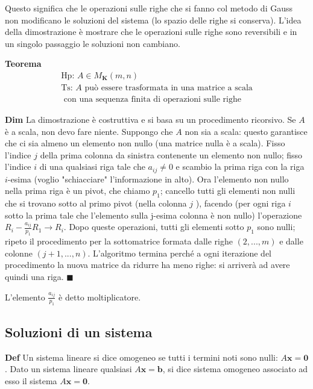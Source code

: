 \documentclass{article}
\begin{document}
Questo significa che le operazioni sulle righe che si fanno col metodo di
Gauss non modificano le soluzioni del sistema (lo spazio delle righe si
conserva). L'idea della dimostrazione \`{e} mostrare che le operazioni sulle
righe sono reversibili e in un singolo passaggio le soluzioni non cambiano.

\textbf{Teorema}%
\begin{gather*}
\text{Hp}\text{: }A\in M_{\mathbf{K}}\left( m,n\right) \\
\text{Ts}\text{: }A\text{ pu\`{o} essere trasformata in una matrice a scala}
\\
\text{ con una sequenza finita di operazioni sulle righe}
\end{gather*}

\textbf{Dim} La dimostrazione \`{e} costruttiva e si basa su un procedimento
ricorsivo. Se $A$ \`{e} a scala, non devo fare niente. Suppongo che $A$ non
sia a scala: questo garantisce che ci sia almeno un elemento non nullo (una
matrice nulla \`{e} a scala). Fisso l'indice $j$ della prima colonna da
sinistra contenente un elemento non nullo; fisso l'indice $i$ di una
qualsiasi riga tale che $a_{ij}\neq 0$ e scambio la prima riga con la riga $%
i $-esima (voglio "schiacciare" l'informazione in alto). Ora l'elemento non
nullo nella prima riga \`{e} un pivot, che chiamo $p_{1}$; cancello tutti
gli elementi non nulli che si trovano sotto al primo pivot (nella colonna $j$%
), facendo (per ogni riga $i$ sotto la prima tale che l'elemento sulla
j-esima colonna \`{e} non nullo) l'operazione $R_{i}-\frac{a_{ij}}{p_{1}}%
R_{1}\rightarrow R_{i}$. Dopo queste operazioni, tutti gli elementi sotto $%
p_{1}$ sono nulli; ripeto il procedimento per la sottomatrice formata dalle
righe $\left( 2,...,m\right) $ e dalle colonne $\left( j+1,...,n\right) $.
L'algoritmo termina perch\'{e} a ogni iterazione del procedimento la nuova
matrice da ridurre ha meno righe: si arriver\`{a} ad avere quindi una riga. $%
\blacksquare $

L'elemento $\frac{a_{ij}}{p_{1}}$ \`{e} detto moltiplicatore.

\subsection{Soluzioni di un sistema}

\textbf{Def} Un sistema lineare si dice omogeneo se tutti i termini noti
sono nulli: $A\mathbf{x}=\mathbf{0}$. Dato un sistema lineare qualsiasi $A%
\mathbf{x}=\mathbf{b}$, si dice sistema omogeneo associato ad esso il
sistema $A\mathbf{x}=\mathbf{0}$.
\end{document}
